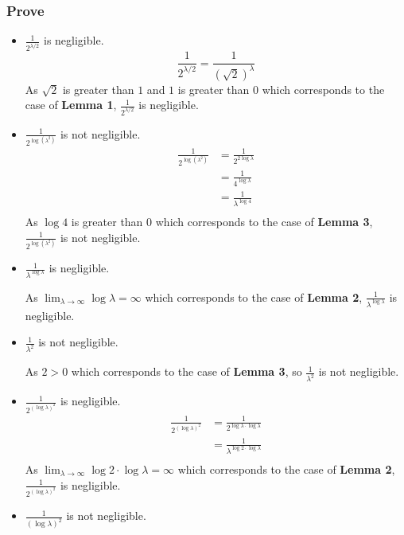 \documentclass[a4paper,12pt]{article}
\begin{document}
\subsubsection{Prove}
\begin{itemize}
    \item $\frac{1}{2^{\lambda/2}}$ is negligible.
          \begin{equation}
              \frac{1}{2^{\lambda/2}} = \frac{1}{(\sqrt{2})^\lambda}
          \end{equation}
          As $\sqrt{2}$ is greater than $1$ and $1$ is greater than $0$ which corresponds to the case of \textbf{Lemma 1}, $\frac{1}{2^{\lambda/2}}$ is negligible.
    \item $\frac{1}{2^{\log(\lambda^2)}}$ is not negligible.
          \begin{equation}
              \begin{aligned}
                  \frac{1}{2^{\log(\lambda^2)}} & = \frac{1}{2^{2\log \lambda}} \\
                                                & = \frac{1}{4^{\log \lambda}}  \\
                                                & = \frac{1}{\lambda^{\log 4}}  \\
              \end{aligned}
          \end{equation}
          As $\log 4$ is greater than $0$ which corresponds to the case of \textbf{Lemma 3}, $\frac{1}{2^{\log(\lambda^2)}}$ is not negligible.
    \item $\frac{1}{\lambda^{\log \lambda}}$ is negligible.

          As $\lim_{\lambda \to \infty}\log \lambda = \infty$ which corresponds to the case of \textbf{Lemma 2}, $\frac{1}{\lambda^{\log \lambda}}$ is negligible.
    \item $\frac{1}{\lambda^2}$ is not negligible.

          As $2 > 0$ which corresponds to the case of \textbf{Lemma 3}, so $\frac{1}{\lambda^2}$ is not negligible.
    \item $\frac{1}{2^{(\log \lambda)^2}}$ is negligible.
          \begin{equation}
              \begin{aligned}
                  \frac{1}{2^{(\log \lambda)^2}} & = \frac{1}{2^{\log \lambda \cdot \log \lambda}} \\
                                                 & = \frac{1}{\lambda^{\log 2\cdot \log \lambda}}  \\
              \end{aligned}
          \end{equation}
          As $\lim_{\lambda \to \infty} \log 2\cdot \log \lambda = \infty$ which corresponds to the case of \textbf{Lemma 2}, $\frac{1}{2^{(\log \lambda)^2}}$ is negligible.
    \item $\frac{1}{(\log \lambda)^2}$ is not negligible.


\end{itemize}
\end{document}
